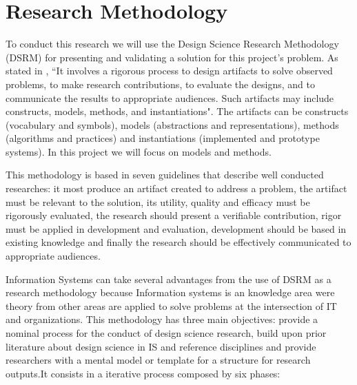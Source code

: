 
% 
% 

\section{Research Methodology}

To conduct this research we will use the Design Science Research Methodology (DSRM) \cite{DSRM} for presenting and validating a solution for this project's problem. As stated in \cite{DSRM}, ``It involves a rigorous process to design artifacts to solve observed problems, to make research contributions, to evaluate the designs, and to communicate the results to appropriate audiences. Such artifacts may include constructs, models, methods, and instantiations". The artifacts can be constructs (vocabulary and symbols), models (abstractions and representations), methods (algorithms and practices) and instantiations (implemented and prototype systems). In this project we will focus on models and methods.\par
This methodology is based in seven guidelines that describe well conducted researches: it most produce an artifact created to address a problem, the artifact must be relevant to the solution, its utility, quality and efficacy must be rigorously evaluated, the research should present a verifiable contribution, rigor must be applied in development and evaluation, development should be based in existing knowledge and finally the research should be effectively communicated to appropriate audiences.\par
Information Systems can take several advantages from the use of DSRM as a research methodology because Information systems is an knowledge area were theory from other areas are applied to solve problems at the intersection of IT and organizations.\cite{DSRM}
This methodology has three main objectives: provide a nominal process for the conduct of design science research, build upon prior literature about design science in IS and reference disciplines and provide researchers with a mental model or template for a structure for research outputs.It consists in a iterative process composed by six phases:

